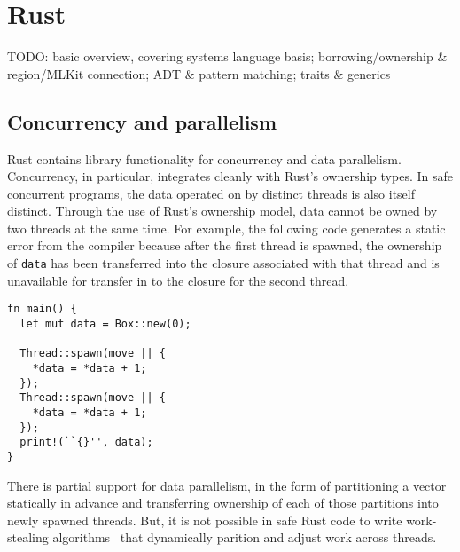 
\section{Rust}
\label{sec:rust}

TODO: basic overview, covering systems language basis; borrowing/ownership \& region/MLKit connection; ADT \& pattern matching; traits \& generics


\subsection{Concurrency and parallelism}

Rust contains library functionality for concurrency and data parallelism.
Concurrency, in particular, integrates cleanly with Rust's ownership types.
In safe concurrent programs, the data operated on by distinct threads is also itself distinct.
Through the use of Rust's ownership model, data cannot be owned by two threads at the same time.
For example, the following code generates a static error from the compiler because after the first
thread is spawned, the ownership of \lstinline{data} has been transferred into the closure associated
with that thread and is unavailable for transfer in to the closure for the second thread.
\begin{lstlisting}
fn main() {
  let mut data = Box::new(0);

  Thread::spawn(move || {
    *data = *data + 1;
  });
  Thread::spawn(move || {
    *data = *data + 1;
  });
  print!(``{}'', data);
}
\end{lstlisting}

There is partial support for data parallelism, in the form of partitioning a vector statically in advance
and transferring ownership of each of those partitions into newly spawned threads.
But, it is not possible in safe Rust code to write work-stealing algorithms~\cite{blumeofe:multiprogrammed-work-stealing}
that dynamically parition and adjust work across threads.


